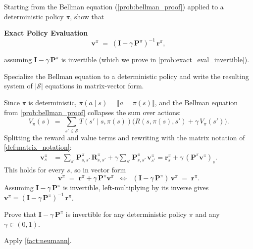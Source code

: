 \documentclass[11pt]{article}
\newcommand{\cS}{\mathcal{S}}
\begin{document}
\begin{exercise}
\label{prob:exact_eval_derive} Starting from the Bellman equation (\cref{prob:bellman_proof}) applied to a deterministic policy $\pi$, show that
\begin{callout}[note]
\textbf{Exact Policy Evaluation}
$$
\mathbf{v}^\pi \;=\; (\mathbf{I} - \gamma\, \mathbf{P}^\pi)^{-1}\, \mathbf{r}^\pi,
$$
\end{callout}
assuming $\mathbf{I} - \gamma\, \mathbf{P}^\pi$ is invertible (which we prove in \cref{prob:exact_eval_invertible}).

\begin{hint}
Specialize the Bellman equation to a deterministic policy and write the resulting system of $|\cS|$ equations in matrix-vector form.
\end{hint}
\end{exercise}

\begin{solution}
Since $\pi$ is deterministic, $\pi(a \mid s) = \llbracket a = \pi(s) \rrbracket$, and the Bellman equation from \cref{prob:bellman_proof} collapses the sum over actions:
$$
V_\pi(s) \;=\; \sum_{s' \in \cS} T(s' \mid s, \pi(s))\bigl(R(s, \pi(s), s') + \gamma\, V_\pi(s')\bigr).
$$
Splitting the reward and value terms and rewriting with the matrix notation of \cref{def:matrix_notation}:
\begin{align*}
\mathbf{v}^\pi_s
&= \sum_{s'} \mathbf{P}^\pi_{s,s'}\, \mathbf{R}^\pi_{s,s'} + \gamma \sum_{s'} \mathbf{P}^\pi_{s,s'}\, \mathbf{v}^\pi_{s'}
= \mathbf{r}^\pi_s + \gamma\, (\mathbf{P}^\pi \mathbf{v}^\pi)_s.
\end{align*}
This holds for every $s$, so in vector form
$$
\mathbf{v}^\pi \;=\; \mathbf{r}^\pi + \gamma\, \mathbf{P}^\pi \mathbf{v}^\pi
\;\;\Longleftrightarrow\;\; (\mathbf{I} - \gamma\, \mathbf{P}^\pi)\, \mathbf{v}^\pi \;=\; \mathbf{r}^\pi.
$$
Assuming $\mathbf{I} - \gamma\, \mathbf{P}^\pi$ is invertible, left-multiplying by its inverse gives $\mathbf{v}^\pi = (\mathbf{I} - \gamma\, \mathbf{P}^\pi)^{-1}\, \mathbf{r}^\pi$.
\end{solution}

\begin{exercise}
\label{prob:exact_eval_invertible} Prove that $\mathbf{I} - \gamma\, \mathbf{P}^\pi$ is invertible for any deterministic policy $\pi$ and any $\gamma \in (0, 1)$.

\begin{hint}
Apply \cref{fact:neumann}.
\end{hint}
\end{exercise}
\end{document}
